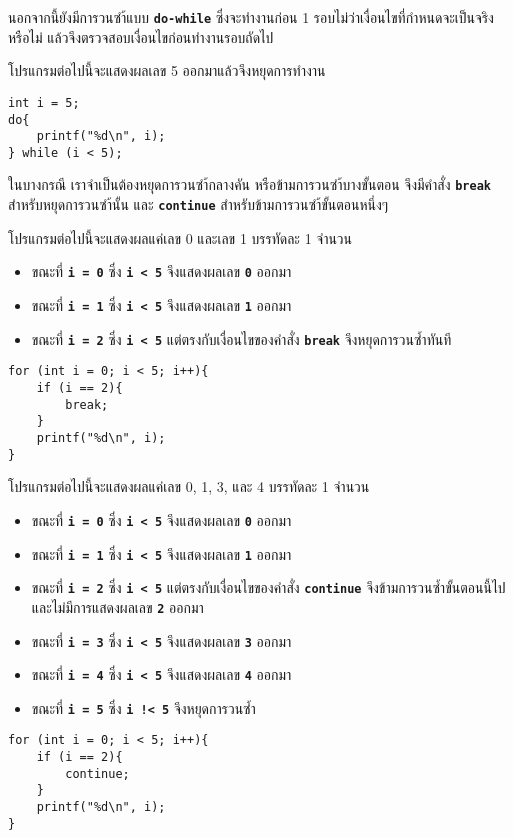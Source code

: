 นอกจากนี้ยังมีการวนซำ้แบบ \textbf{\texttt{do-while}} ซึ่งจะทำงานก่อน 1 รอบไม่ว่าเงื่อนไขที่กำหนดจะเป็นจริงหรือไม่ แล้วจึงตรวจสอบเงื่อนไขก่อนทำงานรอบถัดไป
\begin{example}
โปรแกรมต่อไปนี้จะแสดงผลเลข 5 ออกมาแล้วจึงหยุดการทำงาน
\begin{lstlisting}
int i = 5;
do{
	printf("%d\n", i);
} while (i < 5);
\end{lstlisting}
\end{example}

ในบางกรณี เราจำเป็นต้องหยุดการวนซำ้กลางคัน หรือข้ามการวนซำ้บางขั้นตอน จึงมีคำสั่ง \textbf{\texttt{break}} สำหรับหยุดการวนซำ้นั้น และ \textbf{\texttt{continue}} สำหรับข้ามการวนซำ้ขั้นตอนหนึ่งๆ

\begin{example}
โปรแกรมต่อไปนี้จะแสดงผลแค่เลข 0 และเลข 1 บรรทัดละ 1 จำนวน
\begin{itemize}
\item ขณะที่ \textbf{\texttt{i = 0}} ซึ่ง \textbf{\texttt{i < 5}} จึงแสดงผลเลข \textbf{\texttt{0}} ออกมา
\item ขณะที่ \textbf{\texttt{i = 1}} ซึ่ง \textbf{\texttt{i < 5}} จึงแสดงผลเลข \textbf{\texttt{1}} ออกมา
\item ขณะที่ \textbf{\texttt{i = 2}} ซึ่ง \textbf{\texttt{i < 5}} แต่ตรงกับเงื่อนไขของคำสั่ง \textbf{\texttt{break}} จึงหยุดการวนซ้ำทันที
\end{itemize}
\begin{lstlisting}
for (int i = 0; i < 5; i++){
	if (i == 2){
		break;
	}
	printf("%d\n", i);
}
\end{lstlisting}
\end{example}

\begin{example}
โปรแกรมต่อไปนี้จะแสดงผลแค่เลข 0, 1, 3, และ 4 บรรทัดละ 1 จำนวน
\begin{itemize}
\item ขณะที่ \textbf{\texttt{i = 0}} ซึ่ง \textbf{\texttt{i < 5}} จึงแสดงผลเลข \textbf{\texttt{0}} ออกมา
\item ขณะที่ \textbf{\texttt{i = 1}} ซึ่ง \textbf{\texttt{i < 5}} จึงแสดงผลเลข \textbf{\texttt{1}} ออกมา
\item ขณะที่ \textbf{\texttt{i = 2}} ซึ่ง \textbf{\texttt{i < 5}} แต่ตรงกับเงื่อนไขของคำสั่ง \textbf{\texttt{continue}} จึงข้ามการวนซ้ำขั้นตอนนี้ไป และไม่มีการแสดงผลเลข \textbf{\texttt{2}} ออกมา
\item ขณะที่ \textbf{\texttt{i = 3}} ซึ่ง \textbf{\texttt{i < 5}} จึงแสดงผลเลข \textbf{\texttt{3}} ออกมา
\item ขณะที่ \textbf{\texttt{i = 4}} ซึ่ง \textbf{\texttt{i < 5}} จึงแสดงผลเลข \textbf{\texttt{4}} ออกมา
\item ขณะที่ \textbf{\texttt{i = 5}} ซึ่ง \textbf{\texttt{i !< 5}} จึงหยุดการวนซ้ำ
\end{itemize}
\begin{lstlisting}
for (int i = 0; i < 5; i++){
	if (i == 2){
		continue;
	}
	printf("%d\n", i);
}
\end{lstlisting}
\end{example}
